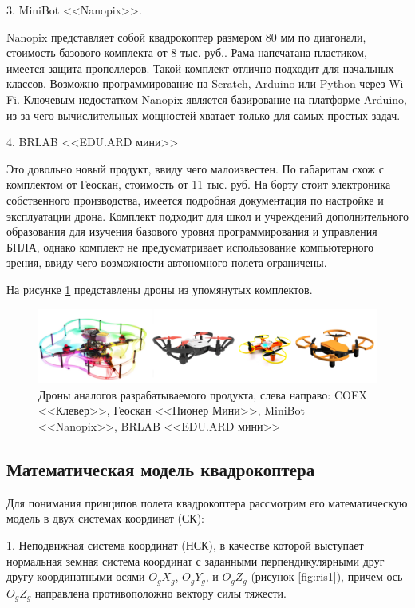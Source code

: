 3. MiniBot <<Nanopix>>.

Nanopix представляет собой квадрокоптер размером 80 мм по диагонали, стоимость базового комплекта от 8 тыс. руб.. Рама напечатана пластиком, имеется защита пропеллеров. Такой комплект отлично подходит для начальных классов. Возможно программирование на Scratch, Arduino или Python через Wi-Fi. Ключевым недостатком Nanopix является базирование на платформе Arduino, из-за чего вычислительных мощностей хватает только для самых простых задач.

4. BRLAB <<EDU.ARD мини>>

Это довольно новый продукт, ввиду чего малоизвестен. По габаритам схож с комплектом от Геоскан, стоимость от 11 тыс. руб. На борту стоит электроника собственного производства, имеется подробная документация по настройке и эксплуатации дрона. Комплект подходит для школ и учреждений дополнительного образования для изучения базового уровня программирования и управления БПЛА, однако комплект не предусматривает использование компьютерного зрения, ввиду чего возможности автономного полета ограничены.

На рисунке \ref{fig:ris0} представлены дроны из упомянутых комплектов.
\begin{figure}[H]
	\centering
	\includegraphics[width=0.8\linewidth]{./pics/analogi}
	\caption{Дроны аналогов разрабатываемого продукта, слева направо: COEX <<Клевер>>, Геоскан <<Пионер Мини>>, MiniBot <<Nanopix>>, BRLAB <<EDU.ARD мини>>
	}
	\label{fig:ris0}
\end{figure}

\subsection{Математическая модель квадрокоптера}

Для понимания принципов полета квадрокоптера рассмотрим его математическую модель в двух системах координат (СК):

1. Неподвижная система координат (НСК), в качестве которой выступает нормальная земная система координат \cite{gost} с заданными перпендикулярными друг другу координатными осями \(O_{g}X_{g}\), \(O_{g}Y_{g}\), и \(O_{g}Z_{g}\) (рисунок \ref{fig:ris1}), причем ось \(O_{g}Z_{g}\) направлена противоположно вектору силы тяжести.

